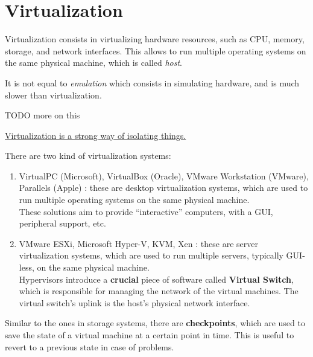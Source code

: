 \chapter{Virtualization}

Virtualization consists in virtualizing hardware resources, such as CPU, memory, storage, and network interfaces. This allows to run multiple operating systems on the same physical machine, which is called \textit{host}.

It is not equal to \textit{emulation} which consists in simulating hardware, and is much slower than virtualization.

TODO more on this

\ul{Virtualization is a strong way of isolating things.}

There are two kind of virtualization systems:
\begin{enumerate}
   \item VirtualPC (Microsoft), VirtualBox (Oracle), VMware Workstation (VMware), Parallels (Apple) : these are desktop virtualization systems, which are used to run multiple operating systems on the same physical machine.\\
   These solutions aim to provide ``interactive'' computers, with a GUI, peripheral support, etc. 
   \item VMware ESXi, Microsoft Hyper-V, KVM, Xen : these are server virtualization systems, which are used to run multiple servers, typically GUI-less, on the same physical machine.\\
   Hypervisors introduce a \textbf{crucial} piece of software called \textbf{Virtual Switch}, which is responsible for managing the network of the virtual machines.
   The virtual switch's uplink is the host's physical network interface.
\end{enumerate}

Similar to the ones in storage systems, there are \textbf{checkpoints}, which are used to save the state of a virtual machine at a certain point in time. This is useful to revert to a previous state in case of problems.